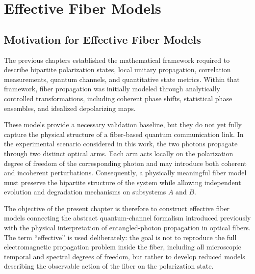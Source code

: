 
\chapter{Effective Fiber Models}
\label{ch:effective_fiber_models}


\section{Motivation for Effective Fiber Models}
\label{sec:motivation_effective_fiber_models}

The previous chapters established the mathematical framework required to describe bipartite polarization states, local unitary propagation, correlation measurements, quantum channels, and quantitative state metrics. Within that framework, fiber propagation was initially modeled through analytically controlled transformations, including coherent phase shifts, statistical phase ensembles, and idealized depolarizing maps.

\medskip

These models provide a necessary validation baseline, but they do not yet fully capture the physical structure of a fiber-based quantum communication link. In the experimental scenario considered in this work, the two photons propagate through two distinct optical arms. Each arm acts locally on the polarization degree of freedom of the corresponding photon and may introduce both coherent and incoherent perturbations. Consequently, a physically meaningful fiber model must preserve the bipartite structure of the system while allowing independent evolution and degradation mechanisms on subsystems \( A \) and \( B \).

\medskip

The objective of the present chapter is therefore to construct effective fiber models connecting the abstract quantum-channel formalism introduced previously with the physical interpretation of entangled-photon propagation in optical fibers. The term ``effective'' is used deliberately: the goal is not to reproduce the full electromagnetic propagation problem inside the fiber, including all microscopic temporal and spectral degrees of freedom, but rather to develop reduced models describing the observable action of the fiber on the polarization state.

